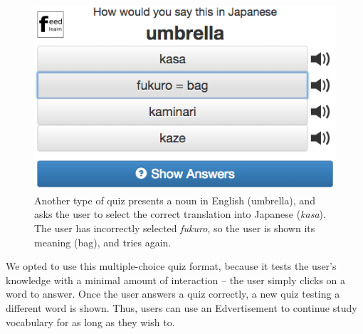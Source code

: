 \documentclass{sigchi}
\begin{document}
\begin{figure}
\centering
\includegraphics[width=1.0\columnwidth]{quiz2}
\caption{Another type of quiz presents a noun in English (umbrella), and asks the user to select the correct translation into Japanese (\textit{kasa}). The user has incorrectly selected \textit{fukuro}, so the user is shown its meaning (bag), and tries again.}
\label{fig:quiz2}
\end{figure}

We opted to use this multiple-choice quiz format, because it tests the user's knowledge with a minimal amount of interaction -- the user simply clicks on a word to answer. Once the user answers a quiz correctly, a new quiz testing a different word is shown. Thus, users can use an Edvertisement to continue study vocabulary for as long as they wish to.


\end{document}
